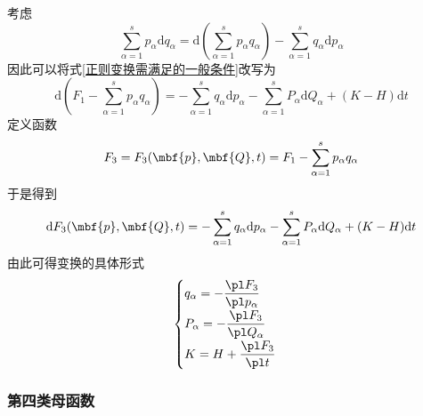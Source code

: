 考虑
\begin{equation*}
	\sum_{\alpha=1}^s p_\alpha \mathrm{d} q_\alpha = \mathrm{d} \left(\sum_{\alpha=1}^s p_\alpha q_\alpha\right) - \sum_{\alpha=1}^s q_\alpha \mathrm{d} p_\alpha
\end{equation*}
因此可以将式\eqref{正则变换需满足的一般条件}改写为
\begin{equation*}
	\mathrm{d} \left(F_1 - \sum_{\alpha=1}^s p_\alpha q_\alpha\right) = -\sum_{\alpha=1}^s q_\alpha \mathrm{d} p_\alpha - \sum_{\alpha=1}^s P_\alpha \mathrm{d} Q_\alpha + (K-H) \mathrm{d} t
\end{equation*}
定义函数
\begin{equation}
	F_3 = F_3(\mbf{p},\mbf{Q},t) = F_1 - \sum_{\alpha=1}^s p_\alpha q_\alpha
	\label{第三类母函数}
\end{equation}
于是得到
\begin{equation}
	\mathrm{d} F_3(\mbf{p},\mbf{Q},t) = -\sum_{\alpha=1}^s q_\alpha \mathrm{d} p_\alpha - \sum_{\alpha=1}^s P_\alpha \mathrm{d} Q_\alpha + (K-H) \mathrm{d} t
	\label{第三类母函数下的正则变换}
\end{equation}
由此可得变换的具体形式
\begin{equation}
	\begin{cases}
		\displaystyle q_\alpha = -\frac{\pl F_3}{\pl p_\alpha} \\[1.5ex]
		\displaystyle P_\alpha = -\frac{\pl F_3}{\pl Q_\alpha} \\[1.5ex]
		\displaystyle K = H + \frac{\pl F_3}{\pl t}
	\end{cases}
\end{equation}

\subsubsection{第四类母函数}

